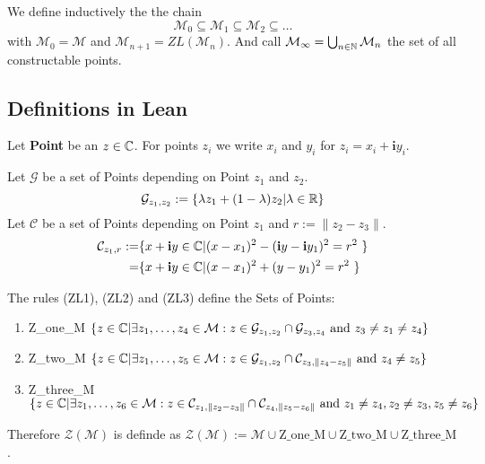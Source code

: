 \documentclass{../Proof_layout_PDF/TemplateExercise}
\begin{document}
\begin{definition}
    We define inductively the the chain
    \begin{equation*}
        \mathcal{M}_0 \subseteq \mathcal{M}_1 \subseteq \mathcal{M}_2 \subseteq \dots
    \end{equation*}
    with $\mathcal{M}_0 = \mathcal{M}$ and $\mathcal{M}_{n+1} = ZL(\mathcal{M}_n)$.\newline
    And call $\mathcal{M}_{\infty} = \bigcup_{n \in \mathbb{N}} \mathcal{M}_n$ the set of all constructable points.
\end{definition}

\subsection{Definitions in Lean}
\begin{definition}
    Let \textbf{Point} be an $z\in\mathbb{C}$. For points $z_i$ we write $x_i$ and $y_i$ for $z_i = x_i +\mathbf{i}y_i$.
\end{definition}
\begin{definition}
    Let \textbf{$\mathcal{G}$} be a set of Points depending on Point $z_1$ and $z_2$.
    \begin{equation*}
        \mathcal{G}_{z_1 ,z_2} := \{\lambda z_1 + (1 - \lambda) z_2 | \lambda \in \mathbb{R}  \}
    \end{equation*}
    Let \textbf{$\mathcal{C}$} be a set of Points depending on Point $z_1$ and $r:=\|z_2-z_3\|$.
    \begin{equation*}
        \begin{aligned}
            \mathcal{C}_{z_1,r} :=& \{ x +\textbf{i} y\in \mathbb{C} | (x - x_1)^2 - (\textbf{i} y-\textbf{i} y_1)^2 =r^2  \ \}\\
            =& \{ x +\textbf{i} y\in \mathbb{C} | (x - x_1)^2 + (y-y_1)^2 =r^2  \ \}
        \end{aligned}
        \end{equation*}
\end{definition}

\begin{definition}
The rules (ZL1), (ZL2) and (ZL3) define the Sets of Points:
\begin{enumerate}
    \item Z\_one\_M $\{z\in \mathbb{C} | \exists z_1,\dots,z_4\in\mathcal{M}: z \in \mathcal{G}_{z_1,z_2} \cap \mathcal{G}_{z_3,z_4} \text{ and } z_3 \ne z_1 \ne z_4\}$
    \item Z\_two\_M $\{z\in \mathbb{C} | \exists z_1,\dots,z_5\in\mathcal{M}: z \in \mathcal{G}_{z_1,z_2} \cap \mathcal{C}_{z_3,\|z_4-z_5\|} \text{ and } z_4\ne z_5\}$
    \item Z\_three\_M $\{z\in \mathbb{C} | \exists z_1,\dots,z_6\in\mathcal{M}: z \in \mathcal{C}_{z_1,\|z_2-z_3\|}  \cap \mathcal{C}_{z_4,\|z_5-z_6\|} \text{ and } z_1\ne z_4, z_2\ne z_3,z_5\ne z_6\}$
\end{enumerate}
Therefore $\mathcal{Z(M)}$ is definde as $ \mathcal{Z(M)}:= \mathcal{M} \cup \text{Z\_one\_M}\cup\text{Z\_two\_M}\cup\text{Z\_three\_M}$.
\end{definition}
\end{document}

